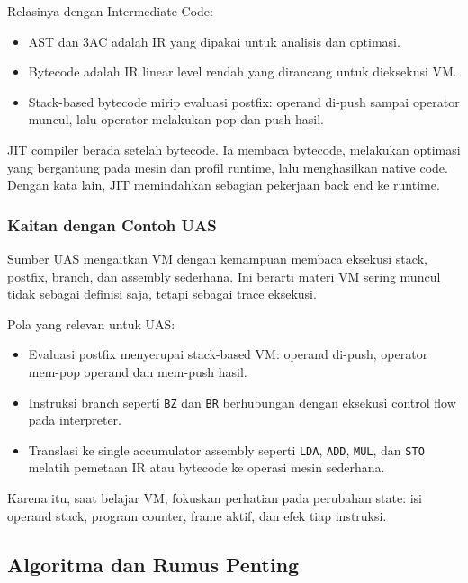 Relasinya dengan Intermediate Code:
\begin{itemize}
    \item AST dan 3AC adalah IR yang dipakai untuk analisis dan optimasi.
    \item Bytecode adalah IR linear level rendah yang dirancang untuk dieksekusi VM.
    \item Stack-based bytecode mirip evaluasi postfix: operand di-push sampai operator muncul, lalu operator melakukan pop dan push hasil.
\end{itemize}

JIT compiler berada setelah bytecode. Ia membaca bytecode, melakukan optimasi yang bergantung pada mesin dan profil runtime, lalu menghasilkan native code. Dengan kata lain, JIT memindahkan sebagian pekerjaan back end ke runtime.

\subsubsection{Kaitan dengan Contoh UAS}

\begin{jawab}
Sumber UAS mengaitkan VM dengan kemampuan membaca eksekusi stack, postfix, branch, dan assembly sederhana. Ini berarti materi VM sering muncul tidak sebagai definisi saja, tetapi sebagai trace eksekusi.
\end{jawab}

Pola yang relevan untuk UAS:
\begin{itemize}
    \item Evaluasi postfix menyerupai stack-based VM: operand di-push, operator mem-pop operand dan mem-push hasil.
    \item Instruksi branch seperti \texttt{BZ} dan \texttt{BR} berhubungan dengan eksekusi control flow pada interpreter.
    \item Translasi ke single accumulator assembly seperti \texttt{LDA}, \texttt{ADD}, \texttt{MUL}, dan \texttt{STO} melatih pemetaan IR atau bytecode ke operasi mesin sederhana.
\end{itemize}

Karena itu, saat belajar VM, fokuskan perhatian pada perubahan state: isi operand stack, program counter, frame aktif, dan efek tiap instruksi.

\subsection{Algoritma dan Rumus Penting}

